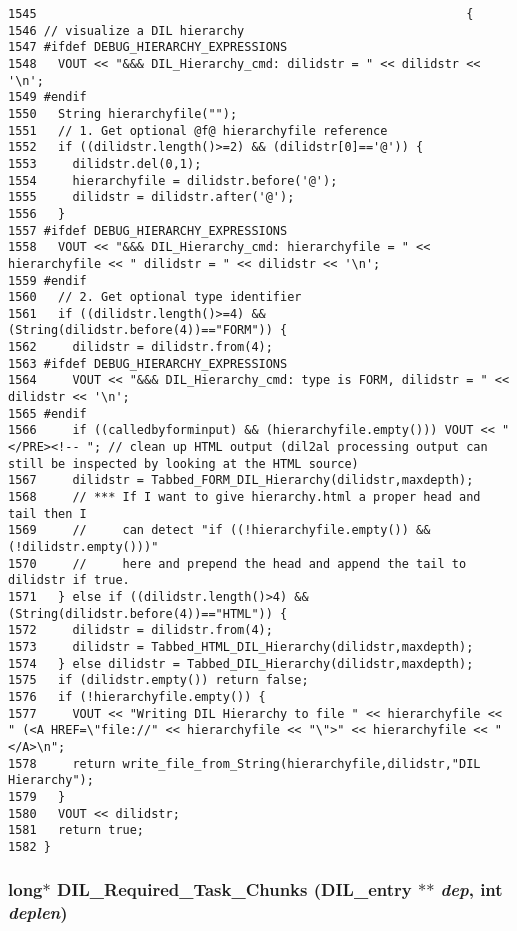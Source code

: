 \footnotesize\begin{verbatim}1545                                                            {
1546 // visualize a DIL hierarchy
1547 #ifdef DEBUG_HIERARCHY_EXPRESSIONS
1548   VOUT << "&&& DIL_Hierarchy_cmd: dilidstr = " << dilidstr << '\n';
1549 #endif
1550   String hierarchyfile("");
1551   // 1. Get optional @f@ hierarchyfile reference
1552   if ((dilidstr.length()>=2) && (dilidstr[0]=='@')) {
1553     dilidstr.del(0,1);
1554     hierarchyfile = dilidstr.before('@');
1555     dilidstr = dilidstr.after('@');
1556   }
1557 #ifdef DEBUG_HIERARCHY_EXPRESSIONS
1558   VOUT << "&&& DIL_Hierarchy_cmd: hierarchyfile = " << hierarchyfile << " dilidstr = " << dilidstr << '\n';
1559 #endif
1560   // 2. Get optional type identifier
1561   if ((dilidstr.length()>=4) && (String(dilidstr.before(4))=="FORM")) {
1562     dilidstr = dilidstr.from(4);
1563 #ifdef DEBUG_HIERARCHY_EXPRESSIONS
1564     VOUT << "&&& DIL_Hierarchy_cmd: type is FORM, dilidstr = " << dilidstr << '\n';
1565 #endif
1566     if ((calledbyforminput) && (hierarchyfile.empty())) VOUT << "</PRE><!-- "; // clean up HTML output (dil2al processing output can still be inspected by looking at the HTML source)
1567     dilidstr = Tabbed_FORM_DIL_Hierarchy(dilidstr,maxdepth);
1568     // *** If I want to give hierarchy.html a proper head and tail then I
1569     //     can detect "if ((!hierarchyfile.empty()) && (!dilidstr.empty()))"
1570     //     here and prepend the head and append the tail to dilidstr if true.
1571   } else if ((dilidstr.length()>4) && (String(dilidstr.before(4))=="HTML")) {
1572     dilidstr = dilidstr.from(4);
1573     dilidstr = Tabbed_HTML_DIL_Hierarchy(dilidstr,maxdepth);
1574   } else dilidstr = Tabbed_DIL_Hierarchy(dilidstr,maxdepth);
1575   if (dilidstr.empty()) return false;
1576   if (!hierarchyfile.empty()) {
1577     VOUT << "Writing DIL Hierarchy to file " << hierarchyfile << " (<A HREF=\"file://" << hierarchyfile << "\">" << hierarchyfile << "</A>\n";
1578     return write_file_from_String(hierarchyfile,dilidstr,"DIL Hierarchy");
1579   }
1580   VOUT << dilidstr;
1581   return true;
1582 }
\end{verbatim}\normalsize 
{}
\subsubsection{\setlength{\rightskip}{0pt plus 5cm}long$\ast$ DIL\_\-Required\_\-Task\_\-Chunks ({\bf DIL\_\-entry} $\ast$$\ast$ {\em dep}, int {\em deplen})}\label{dil2al_8hh_a289}




